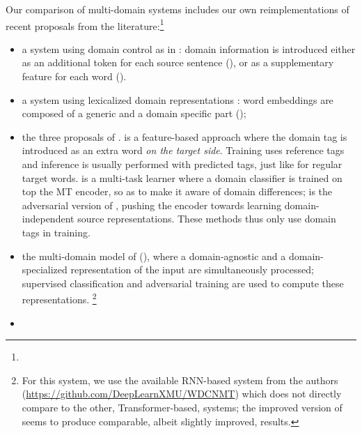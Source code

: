 Our comparison of multi-domain systems includes our own reimplementations of recent proposals from the literature:\footnote{}
\begin{itemize}
\item a system using domain control as in \cite{Kobus17domain}: domain information is introduced either as an additional token for each source sentence (), or as a supplementary feature for each word ().
\item a system using lexicalized domain representations \cite{Pham19generic}: word embeddings are composed of a generic and a domain specific part ();
\item the three proposals of \cite{Britz17effective}.  is a feature-based approach where the domain tag is introduced as an extra word \textsl{on the target side}. Training uses reference tags and inference is usually performed with predicted tags, just like for regular target words.  is a multi-task learner where a domain classifier is trained on top the MT encoder, so as to make it aware of domain differences;  is the adversarial version of , pushing the encoder towards learning domain-independent source representations. These methods thus only use domain tags in training.
\item the multi-domain model of \cite{Zeng18multidomain} (), where a domain-agnostic and a domain-specialized representation of the input are simultaneously processed; supervised classification and adversarial training are used to compute these representations. \footnote{For this system, we use the available RNN-based system from the authors (\url{https://github.com/DeepLearnXMU/WDCNMT}) which does not directly compare to the other, Transformer-based, systems; the improved version of \cite{Su19exploring} seems to produce comparable, albeit slightly improved, results.}
\item {}
  
\end{itemize}
